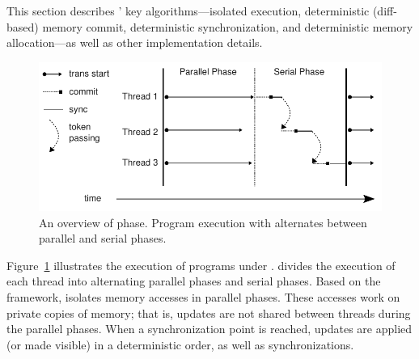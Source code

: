 \label{sec:dthreads-architecture}
This section describes \dthreads{}’ key algorithms---isolated execution, deterministic (diff-based) memory commit, deterministic synchronization, and deterministic memory allocation---as well as other implementation details.

\begin{figure}
{\centering 
\includegraphics[width=6in]{dthreads/figure/phase}
\caption{An overview of \dthreads{} phase. Program execution with \dthreads{} alternates between parallel and serial phases.\label{fig:phase}}
}
\end{figure}

Figure~\ref{fig:phase} illustrates the execution of programs under \dthreads{}. \dthreads{} divides the execution of each thread into alternating parallel phases and serial phases. 
Based on the \sheriff{} framework, \dthreads{} isolates memory accesses in parallel phases. These accesses work on private copies of memory; that is, updates are not shared between threads during the parallel phases. When a synchronization point is reached, updates are applied (or made visible) in a deterministic order, as well as synchronizations. 
  
